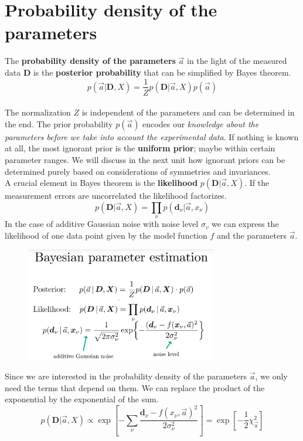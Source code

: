 \documentclass[12pt, a4paper]{scrartcl}
\begin{document}
\section*{Probability density of the parameters}
The \textbf{probability density of the parameters} $\vec{a}$ in the light of the measured data $\boldsymbol{D}$ is the \textbf{posterior probability} that can
be simplified by Bayes theorem.
\begin{equation*}\boxed{p(\vec{a}|\boldsymbol{D},X)=\frac 1Z p(\boldsymbol{D}|\vec{a},X)p(\vec{a})
}\end{equation*}\\
 The normalization $Z$ is independent of the parameters and can be determined in the end.
The prior probability $p(\vec{a})$ encodes our \textit{knowledge about the parameters before we take into account the experimental data}.
If nothing is known at all, the most ignorant prior is the \textbf{uniform prior}; maybe within
certain parameter ranges. We will discuss in the next unit how ignorant
priors can be determined purely based on considerations of symmetries and
invariances.\\
A crucial element in Bayes theorem is the \textbf{likelihood} $p(\boldsymbol{D}|\vec{a},X)$.
If the measurement errors are uncorrelated the likelihood factorizes.
\[ p(\boldsymbol{D}|\vec{a},X)=\prod_{\nu} p(\boldsymbol{d}_{\nu}|\vec{a},x_{\nu})\]
In the case of additive Gaussian noise with noise level $\sigma_v$ we can express the
likelihood of one data point given by the model function $f$ and the parameters $\vec{a}$.%
\begin{figure}[H]
	\centering
	\includegraphics[width=0.75\textwidth]{7_3.png}
\end{figure}
Since we are interested in the probability density of the parameters $\vec{a}$,%
we only need the terms that depend on them. We can replace the product
of the exponential by the exponential of the sum.
\begin{equation*}\boxed{ p(\boldsymbol{D}|\vec{a},X)\propto \exp\left[-\sum_{\nu}\frac{\boldsymbol{d}_{\nu}-f(x_{\nu},\vec{a})^2}{2\sigma_{\nu}^2}\right]=\exp\left[-\frac 12 \chi_{\vec{a}}^2\right]}\end{equation*}\\
\end{document}
